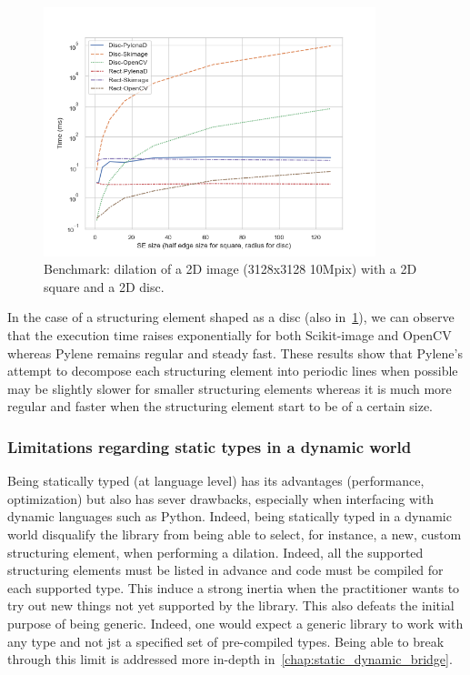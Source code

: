 \begin{figure}[htb]
  \centering
  \includegraphics[width=3.8in]{figs/bench_disc_rect_by_SE}
  \caption{Benchmark: dilation of a 2D image (3128x3128 \eqmark 10Mpix) with a 2D square and a 2D disc. }
  \label{fig:gen.bench.square.disc}
\end{figure}



In the case of a structuring element shaped as a disc (also in~\cref{fig:gen.bench.square.disc}), we can observe that
the execution time raises exponentially for both Scikit-image and OpenCV whereas Pylene remains regular and steady fast.
These results show that Pylene's attempt to decompose each structuring element into periodic lines when possible may be
slightly slower for smaller structuring elements whereas it is much more regular and faster when the structuring element
start to be of a certain size.


\subsubsection{Limitations regarding static types in a dynamic world}

Being statically typed (at language level) has its advantages (performance, optimization) but also has sever drawbacks,
especially when interfacing with dynamic languages such as Python. Indeed, being statically typed in a dynamic world
disqualify the library from being able to select, for instance, a new, custom structuring element, when performing a
dilation. Indeed, all the supported structuring elements must be listed in advance and code must be compiled for each
supported type. This induce a strong inertia when the practitioner wants to try out new things not yet supported by the
library. This also defeats the initial purpose of being generic. Indeed, one would expect a generic library to work with
any type and not jst a specified set of pre-compiled types. Being able to break through this limit is addressed more
in-depth in~\cref{chap:static_dynamic_bridge}.


